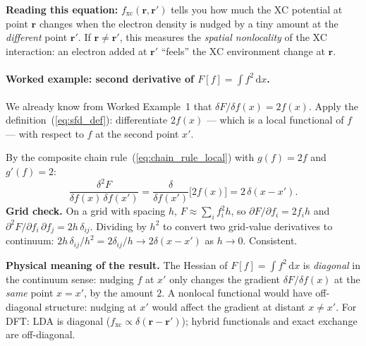 \documentclass[12pt,letterpaper]{article}
\newcommand{\dd}{\mathrm{d}}
\newcommand{\fxc}{f_{\mathrm{xc}}}
\theoremstyle{definition}
\begin{document}
\noindent\textbf{Reading this equation:}
$\fxc(\bm{r},\bm{r}')$ tells you how much the XC potential at point $\bm{r}$
changes when the electron density is nudged by a tiny amount at the
\emph{different} point $\bm{r}'$.
If $\bm{r}\neq\bm{r}'$, this measures the \emph{spatial nonlocality} of the XC
interaction: an electron added at $\bm{r}'$ ``feels'' the XC environment change
at $\bm{r}$.

\paragraph{Worked example: second derivative of $F[f]=\int f^2\,\dd x$.}
We already know from Worked Example~1 that $\delta F/\delta f(x) = 2f(x)$.
Apply the definition~(\ref{eq:sfd_def}): differentiate $2f(x)$ --- which is
a local functional of $f$ --- with respect to $f$ at the second point $x'$.

\begin{derivbox}
By the composite chain rule~(\ref{eq:chain_rule_local}) with $g(f) = 2f$
and $g'(f) = 2$:
\begin{equation}
  \frac{\delta^2 F}{\delta f(x)\,\delta f(x')}
  = \frac{\delta}{\delta f(x')}\bigl[2f(x)\bigr]
  = 2\,\delta(x - x').
  \label{eq:sfd_example}
\end{equation}
\textbf{Grid check.}
On a grid with spacing $h$, $F \approx \sum_i f_i^2 h$, so
$\partial F/\partial f_i = 2f_i h$ and
$\partial^2 F/\partial f_i\,\partial f_j = 2h\,\delta_{ij}$.
Dividing by $h^2$ to convert two grid-value derivatives to continuum:
$2h\,\delta_{ij}/h^2 = 2\delta_{ij}/h \to 2\delta(x-x')$ as $h\to 0$.
Consistent.
\end{derivbox}

\noindent\textbf{Physical meaning of the result.}
The Hessian of $F[f]=\int f^2\,\dd x$ is \emph{diagonal} in the continuum
sense: nudging $f$ at $x'$ only changes the gradient $\delta F/\delta f(x)$
at the \emph{same} point $x = x'$, by the amount $2$.
A nonlocal functional would have off-diagonal structure: nudging at $x'$
would affect the gradient at distant $x\neq x'$.
For DFT: LDA is diagonal ($\fxc \propto \delta(\bm{r}-\bm{r}')$);
hybrid functionals and exact exchange are off-diagonal.
\end{document}

